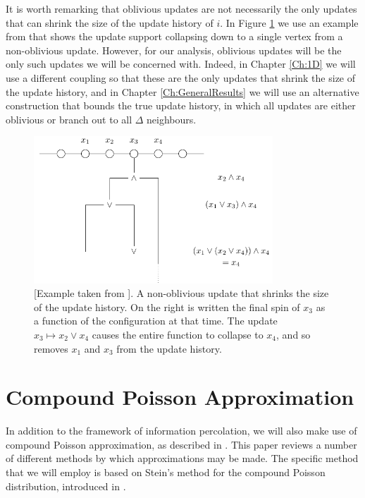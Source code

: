 	
	It is worth remarking that oblivious updates are not necessarily the only updates that can shrink the size of the update history of $i$. In Figure \ref{fig:nonoblivious shrink} we use an example from \cite{Lubetzky2016-wd} that shows the update support collapsing down to a single vertex from a non-oblivious update. However, for our analysis, oblivious updates will be the only such updates we will be concerned with. Indeed, in Chapter \ref{Ch:1D} we will use a different coupling so that these are the only updates that shrink the size of the update history, and in Chapter \ref{Ch:GeneralResults} we will use an alternative construction that bounds the true update history, in which all updates are either oblivious or branch out to all $\Delta$ neighbours.

	\begin{figure}
		\centering
		\includegraphics[width = 0.8\textwidth]{Figures/IsingCouplingTime/nonoblivious_shrink.pdf}
		\caption[A non-oblivious update that shrinks the size of the update history]{[Example taken from \cite{Lubetzky2016-wd}]. A non-oblivious update that shrinks the size of the update history. On the right is written the final spin of $x_3$ as a function of the configuration at that time. The update $x_3 \mapsto x_2 \vee x_4$ causes the entire function to collapse to $x_4$, and so removes $x_1$ and $x_3$ from the update history.}
		\label{fig:nonoblivious shrink}
	\end{figure}
	

\section{Compound Poisson Approximation}
\label{sec:compound poisson overview}
	In addition to the framework of information percolation, we will also make use of compound Poisson approximation, as described in \cite{Barbour2001-nh}. This paper reviews a number of different methods by which approximations may be made. The specific method that we will employ is based on Stein's method for the compound Poisson distribution, introduced in \cite{Barbour1992-mc}.

